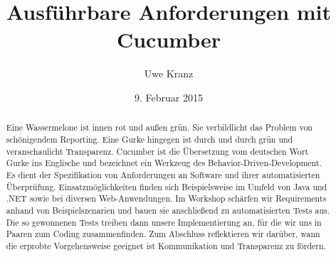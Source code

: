 \documentclass{article}
\title{Ausführbare Anforderungen mit Cucumber}
\author{Uwe Kranz}
\date{9. Februar 2015}
\begin{document}
\maketitle
\thispagestyle{empty}

\begin{abstract}
\setlength\parindent{0pt}Eine Wassermelone ist innen rot und außen grün. Sie verbildlicht das Problem von schönigendem Reporting. Eine Gurke hingegen ist durch und durch grün und veranschaulicht Transparenz. Cucumber ist die Übersetzung vom deutschen Wort Gurke ins Englische und bezeichnet ein Werkzeug des Behavior-Driven-Development. Es dient der Spezifikation von Anforderungen an Software und ihrer automatisierten Überprüfung. Einsatzmöglichkeiten finden sich Beispielsweise im Umfeld von Java und .NET sowie bei diversen Web-Anwendungen. Im Workshop schärfen wir Requirements anhand von Beispielszenarien und bauen sie anschließend zu automatisierten Tests aus. Die so gewonnenen Tests treiben dann unsere Implementierung an, für die wir uns in Paaren zum Coding zusammenfinden. Zum Abschluss reflektieren wir darüber, wann die erprobte Vorgehensweise geeignet ist Kommunikation und Transparenz zu fördern.
\end{abstract}
\end{document}
